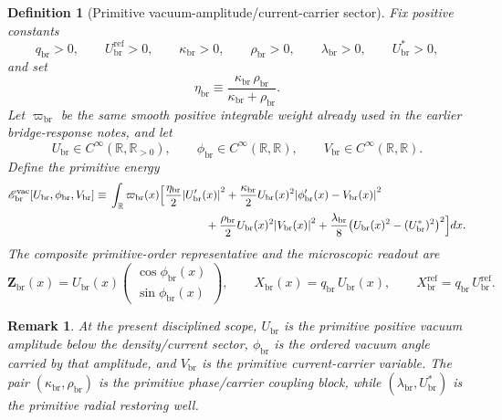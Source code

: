 \documentclass[11pt]{article}
\newcommand{\ProfWeight}{\varpi_{\mathrm{br}}}
\newcommand{\RespMicro}{X_{\mathrm{br}}}
\newcommand{\RespMicroRef}{X_{\mathrm{br}}^{\mathrm{ref}}}
\newcommand{\RespOrderField}{\bm Z_{\mathrm{br}}}
\newcommand{\RespVacAmp}{U_{\mathrm{br}}}
\newcommand{\RespVacRef}{U_{\mathrm{br}}^{\mathrm{ref}}}
\newcommand{\RespVacEq}{U_{\mathrm{br}}^{\ast}}
\newcommand{\RespVacPhase}{\phi_{\mathrm{br}}}
\newcommand{\RespVacCarrier}{V_{\mathrm{br}}}
\newcommand{\RespVacReadout}{q_{\mathrm{br}}}
\newcommand{\RespVacCov}{\kappa_{\mathrm{br}}}
\newcommand{\RespVacRelax}{\rho_{\mathrm{br}}}
\newcommand{\RespVacWell}{\lambda_{\mathrm{br}}}
\newcommand{\RespVacIso}{\eta_{\mathrm{br}}}
\newcommand{\RespVacEnergy}{\mathscr E_{\mathrm{br}}^{\mathrm{vac}}}
\newtheorem{definition}{Definition}
\newtheorem{remark}{Remark}
\begin{document}
\begin{definition}[Primitive vacuum-amplitude/current-carrier sector]
\label{def:vacsector}
Fix positive constants
\begin{equation}
\RespVacReadout>0,
\qquad
\RespVacRef>0,
\qquad
\RespVacCov>0,
\qquad
\RespVacRelax>0,
\qquad
\RespVacWell>0,
\qquad
\RespVacEq>0,
\label{eq:vacconstants}
\end{equation}
and set
\begin{equation}
\RespVacIso\equiv\frac{\RespVacCov\,\RespVacRelax}{\RespVacCov+\RespVacRelax}.
\label{eq:vaciso}
\end{equation}
Let \(\ProfWeight\) be the same smooth positive integrable weight already used in the earlier bridge-response notes, and let
\begin{equation}
\RespVacAmp\in C^\infty(\mathbb R,\mathbb R_{>0}),
\qquad
\RespVacPhase\in C^\infty(\mathbb R,\mathbb R),
\qquad
\RespVacCarrier\in C^\infty(\mathbb R,\mathbb R).
\label{eq:vacfields}
\end{equation}
Define the primitive energy
\begin{align}
\RespVacEnergy[\RespVacAmp,\RespVacPhase,\RespVacCarrier]
\equiv\;&
\int_{\mathbb R}\ProfWeight(x)\Bigl[
\frac{\RespVacIso}{2}\abs{\RespVacAmp'(x)}^2
+
\frac{\RespVacCov}{2}\RespVacAmp(x)^2\abs{\RespVacPhase'(x)-\RespVacCarrier(x)}^2
\nonumber\\
&\hspace{8.5em}
+
\frac{\RespVacRelax}{2}\RespVacAmp(x)^2\abs{\RespVacCarrier(x)}^2
+
\frac{\RespVacWell}{8}\bigl(\RespVacAmp(x)^2-(\RespVacEq)^2\bigr)^2
\Bigr]dx.
\label{eq:vacenergy}
\end{align}
The composite primitive-order representative and the microscopic readout are
\begin{equation}
\RespOrderField(x)
=
\RespVacAmp(x)
\begin{pmatrix}
\cos\RespVacPhase(x)\\
\sin\RespVacPhase(x)
\end{pmatrix},
\qquad
\RespMicro(x)=\RespVacReadout\,\RespVacAmp(x),
\qquad
\RespMicroRef=\RespVacReadout\,\RespVacRef.
\label{eq:vacreadout}
\end{equation}
\end{definition}

\begin{remark}
At the present disciplined scope, \(\RespVacAmp\) is the primitive positive vacuum amplitude below the density/current sector, \(\RespVacPhase\) is the ordered vacuum angle carried by that amplitude, and \(\RespVacCarrier\) is the primitive current-carrier variable. The pair \((\RespVacCov,\RespVacRelax)\) is the primitive phase/carrier coupling block, while \((\RespVacWell,\RespVacEq)\) is the primitive radial restoring well.
\end{remark}
\end{document}
